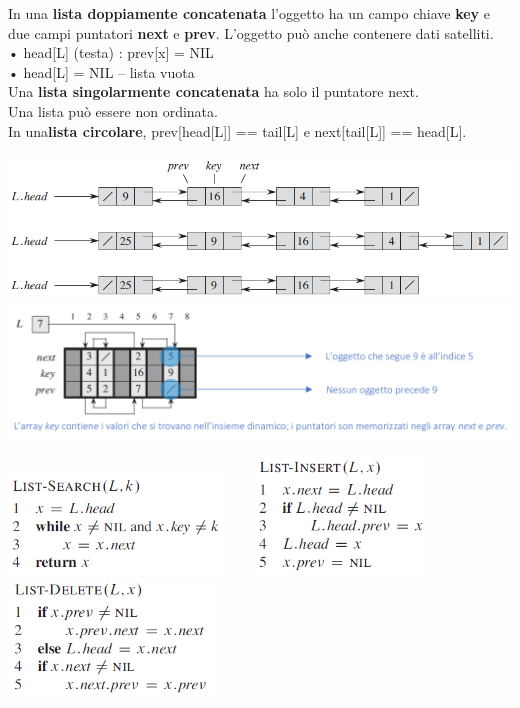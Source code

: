 \documentclass[11pt,a4paper]{article}
\begin{document}
In una \textbf{lista doppiamente concatenata} l’oggetto ha un campo chiave \textbf{key} e due campi puntatori \textbf{next} e \textbf{prev}.
L’oggetto può anche contenere dati satelliti.\\
• head[L] (testa) : prev[x] = NIL\\
• head[L] = NIL – lista vuota\medskip\\
Una \textbf{lista singolarmente concatenata} ha solo il puntatore next.\\
Una lista può essere non ordinata.\\
In una\textbf{lista circolare}, prev[head[L]] == tail[L] e next[tail[L]] == head[L].
\medskip\medskip\medskip
\begin{center}
      \includegraphics[scale=0.35]{img/listaconcatenata1.png}\medskip\medskip\medskip\\
      \includegraphics[scale=0.3]{img/listaconcatenata2.png}\medskip\medskip\medskip
\end{center}
\includegraphics[scale=0.7]{img/listsearch.png}\ \ \ \
\includegraphics[scale=0.7]{img/listinsert.png}\ \ \ \
\includegraphics[scale=0.7]{img/listdelete.png}\medskip\medskip\medskip\medskip\\
\end{document}
